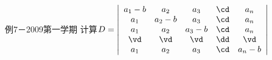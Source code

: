 \begin{frame}
  \begin{footnotesize}
    \begin{exampleblock}{例7－2009第一学期}
      计算$
      D=\left|
      \begin{array}{ccccc}
        a_1-b&a_2&a_3&\cd&a_n\\
        a_1&a_2-b&a_3&\cd&a_n\\
        a_1&a_2&a_3-b&\cd&a_n\\
        \vd&\vd&\vd&\dd&\vd\\
        a_1&a_2&a_3&\cd&a_n-b
      \end{array}
      \right|
      $
    \end{exampleblock}
  \end{footnotesize}
\end{frame}

